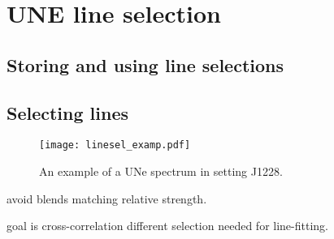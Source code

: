 \section{UNE line selection}
\label{sec:uneselect}

\subsection*{Storing and using line selections}

\subsection*{Selecting lines}

\begin{figure}[ht]
    \begin{center}
\texttt{[image: linesel\_examp.pdf]}
\end{center}
\caption{An example of a UNe spectrum in setting J1228. }
\label{fig:linesel}
\end{figure}


avoid blends
matching relative strength.

goal is cross-correlation
different selection needed for line-fitting.
